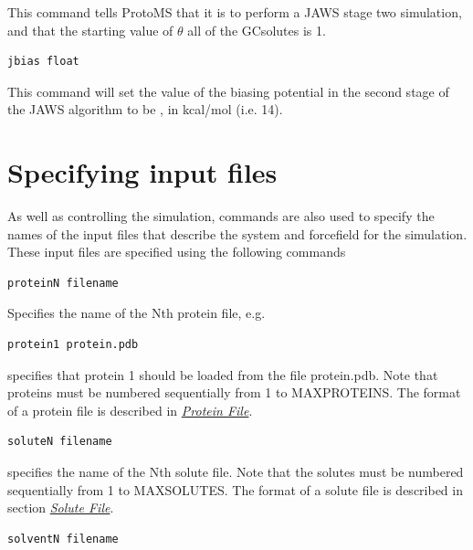 \documentclass[letterpaper,10pt,english]{sphinxmanual}
\begin{document}
This command tells ProtoMS that it is to perform a JAWS stage two simulation, and that the starting value of \(\theta\) all of the GCsolutes is 1.

\begin{Verbatim}[commandchars=\\\{\}]
jbias float
\end{Verbatim}

This command will set the value of the biasing potential in the second stage of the JAWS algorithm to be , in kcal/mol (i.e. 14).


\section{Specifying input files}
\label{protoms:specifying-input-files}\label{protoms:incmd}
As well as controlling the simulation, commands are also used to specify the names of the input files that describe the system and forcefield for the simulation. These input files are specified using the following commands

\begin{Verbatim}[commandchars=\\\{\}]
proteinN filename
\end{Verbatim}

Specifies the name of the Nth protein file, e.g.

\begin{Verbatim}[commandchars=\\\{\}]
protein1 protein.pdb
\end{Verbatim}

specifies that protein 1 should be loaded from the file protein.pdb. Note that proteins must be numbered sequentially from 1 to MAXPROTEINS. The format of a protein file is described in {\hyperref[protoms:protpdb]{\emph{Protein File}}}.

\begin{Verbatim}[commandchars=\\\{\}]
soluteN filename
\end{Verbatim}

specifies the name of the Nth solute file. Note that the solutes must be numbered sequentially from 1 to MAXSOLUTES. The format of a solute file is described in section {\hyperref[protoms:solpdb]{\emph{Solute File}}}.

\begin{Verbatim}[commandchars=\\\{\}]
solventN filename
\end{Verbatim}
\end{document}
